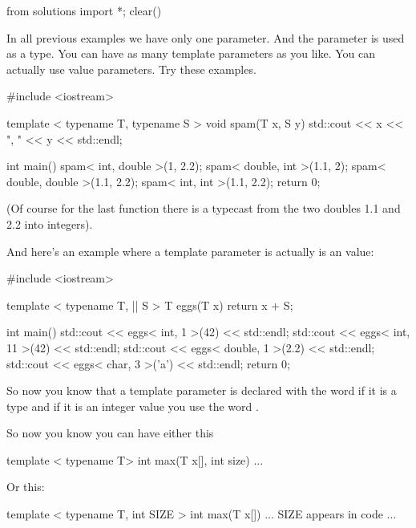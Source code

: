 \begin{python0}
from solutions import *; clear()
\end{python0}

In all previous examples we have only one parameter. And the parameter
is used as a type. You can have as many template parameters as you like.
You can actually use value parameters. Try these examples.

\begin{consolethree}[escapeinside=||]
#include <iostream>

template < typename T, typename S >
void spam(T x, S y)
{
    std::cout << x << ", " << y << std::endl;
}

int main()
{
    spam< int, double >(1, 2.2);
    spam< double, int >(1.1, 2);
    spam< double, double >(1.1, 2.2);
    spam< int, int >(1.1, 2.2);
    return 0;
}
\end{consolethree}

(Of course for the last function there is a typecast from the two
doubles 1.1 and 2.2 into integers).

And here's an example where a template parameter is actually is an  value:

\begin{consolethree}[escapeinside=||]
#include <iostream>

template < typename T, || S >
T eggs(T x)
{
    return x + S;
}

int main()
{
    std::cout << eggs< int, 1 >(42) << std::endl;
    std::cout << eggs< int, 11 >(42) << std::endl;
    std::cout << eggs< double, 1 >(2.2) << std::endl;
    std::cout << eggs< char, 3 >('a') << std::endl;
    return 0;
}
\end{consolethree}

So now you know that a template parameter is declared with the word  if it is a type and if it is an integer value you use the word .



So now you know you can have either this

\begin{consolethree}[escapeinside=||]
template < typename T>
int max(T x[], int size)
{
    ...
}
\end{consolethree}

Or this:

\begin{consolethree}[escapeinside=||]
template < typename T, int SIZE >
int max(T x[])
{
    ... SIZE appears in code ...
}
\end{consolethree}

